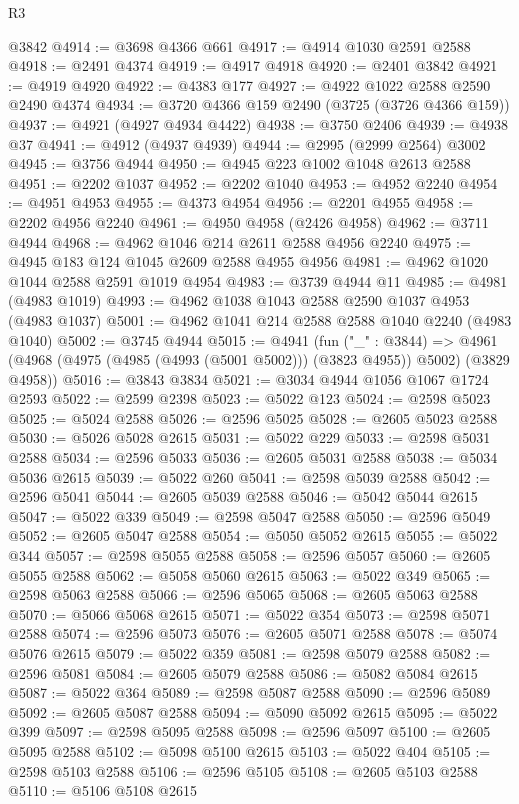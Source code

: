 \begin{lexlean}{R3}
\begin{coremodule}
    @3842
@4914 := @3698 @4366 @661
@4917 := @4914 @1030 @2591 @2588
@4918 := @2491 @4374
@4919 := @4917 @4918
@4920 := @2401 @3842
@4921 := @4919 @4920
@4922 := @4383 @177
@4927 := @4922 @1022 @2588 @2590 @2490 @4374
@4934 := @3720 @4366 @159 @2490 (@3725 (@3726 @4366 @159))
@4937 := @4921 (@4927 @4934 @4422)
@4938 := @3750 @2406
@4939 := @4938 @37
@4941 := @4912 (@4937 @4939)
@4944 := @2995 (@2999 @2564) @3002
@4945 := @3756 @4944
@4950 := @4945 @223 @1002 @1048 @2613 @2588
@4951 := @2202 @1037
@4952 := @2202 @1040
@4953 := @4952 @2240
@4954 := @4951 @4953
@4955 := @4373 @4954
@4956 := @2201 @4955
@4958 := @2202 @4956 @2240
@4961 := @4950 @4958 (@2426 @4958)
@4962 := @3711 @4944
@4968 := @4962 @1046 @214 @2611 @2588 @4956 @2240
@4975 := @4945 @183 @124 @1045 @2609 @2588 @4955 @4956
@4981 := @4962 @1020 @1044 @2588 @2591 @1019 @4954
@4983 := @3739 @4944 @11
@4985 := @4981 (@4983 @1019)
@4993 := @4962 @1038 @1043 @2588 @2590 @1037 @4953 (@4983 @1037)
@5001 := @4962 @1041 @214 @2588 @2588 @1040 @2240 (@4983 @1040)
@5002 := @3745 @4944
@5015 := @4941
    (fun ("_" : @3844) =>
    @4961 (@4968 (@4975 (@4985 (@4993 (@5001 @5002))) (@3823 @4955)) @5002) (@3829 @4958))
@5016 := @3843 @3834
@5021 := @3034 @4944 @1056 @1067 @1724 @2593
@5022 := @2599 @2398
@5023 := @5022 @123
@5024 := @2598 @5023
@5025 := @5024 @2588
@5026 := @2596 @5025
@5028 := @2605 @5023 @2588
@5030 := @5026 @5028 @2615
@5031 := @5022 @229
@5033 := @2598 @5031 @2588
@5034 := @2596 @5033
@5036 := @2605 @5031 @2588
@5038 := @5034 @5036 @2615
@5039 := @5022 @260
@5041 := @2598 @5039 @2588
@5042 := @2596 @5041
@5044 := @2605 @5039 @2588
@5046 := @5042 @5044 @2615
@5047 := @5022 @339
@5049 := @2598 @5047 @2588
@5050 := @2596 @5049
@5052 := @2605 @5047 @2588
@5054 := @5050 @5052 @2615
@5055 := @5022 @344
@5057 := @2598 @5055 @2588
@5058 := @2596 @5057
@5060 := @2605 @5055 @2588
@5062 := @5058 @5060 @2615
@5063 := @5022 @349
@5065 := @2598 @5063 @2588
@5066 := @2596 @5065
@5068 := @2605 @5063 @2588
@5070 := @5066 @5068 @2615
@5071 := @5022 @354
@5073 := @2598 @5071 @2588
@5074 := @2596 @5073
@5076 := @2605 @5071 @2588
@5078 := @5074 @5076 @2615
@5079 := @5022 @359
@5081 := @2598 @5079 @2588
@5082 := @2596 @5081
@5084 := @2605 @5079 @2588
@5086 := @5082 @5084 @2615
@5087 := @5022 @364
@5089 := @2598 @5087 @2588
@5090 := @2596 @5089
@5092 := @2605 @5087 @2588
@5094 := @5090 @5092 @2615
@5095 := @5022 @399
@5097 := @2598 @5095 @2588
@5098 := @2596 @5097
@5100 := @2605 @5095 @2588
@5102 := @5098 @5100 @2615
@5103 := @5022 @404
@5105 := @2598 @5103 @2588
@5106 := @2596 @5105
@5108 := @2605 @5103 @2588
@5110 := @5106 @5108 @2615

\end{coremodule}
\end{lexlean}
